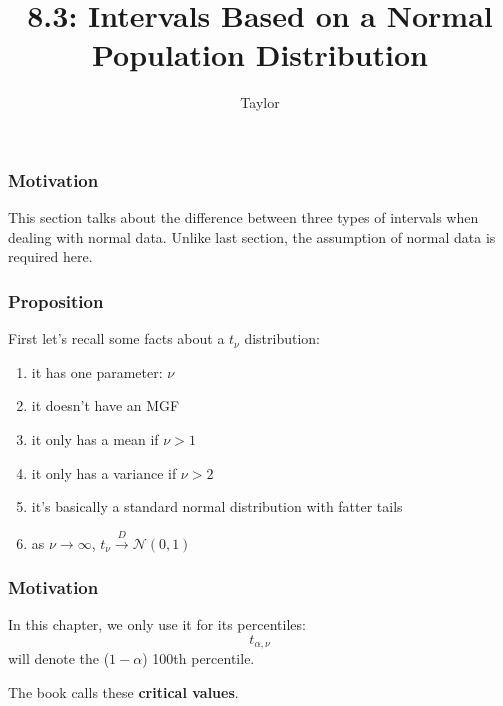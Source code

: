 \documentclass{beamer}
\title["8.3"]{8.3: Intervals Based on a Normal Population Distribution}
\author{Taylor}
\institute[UVA] 
{
University of Virginia \\
\medskip
\textit{} 
}
\date{}
\begin{document}

\begin{frame}
\titlepage 
\end{frame}

\begin{frame}
\frametitle{Motivation}

This section talks about the difference between three types of intervals when dealing with normal data. Unlike last section, the assumption of normal data is required here.

\end{frame}

\begin{frame}
\frametitle{Proposition}

First let's recall some facts about a $t_{\nu}$ distribution:

\begin{enumerate}
\item it has one parameter: $\nu$
\item it doesn't have an MGF
\item it only has a mean if $\nu > 1$
\item it only has a variance if $\nu > 2$
\item it's basically a standard normal distribution with fatter tails
\item as $\nu \to \infty$, $t_{\nu} \overset{D}{\to} \mathcal{N}(0,1)$
\end{enumerate}


\end{frame}

\begin{frame}
\frametitle{Motivation}

In this chapter, we only use it for its percentiles:
\[
t_{\alpha,\nu}
\]
will denote the ($1-\alpha$) 100th percentile.
\newline

The book calls these \textbf{critical values}.

\end{frame}
\end{document}
